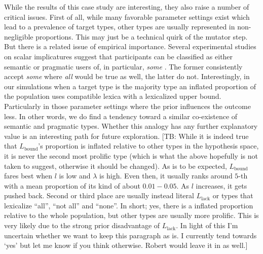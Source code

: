 \documentclass[a4paper, 11pt]{article}
\theoremstyle{Satz}
\newcommand{\tb}[1]{\textcolor[rgb]{.8,.33,.0}{[TB: #1]}}%
\newcommand{\mylang}[1]{\ensuremath{L_{\text{#1}}}\xspace} %
\newcommand{\Lbound}{\mylang{bound}}
\newcommand{\Llack}{\mylang{lack}}
\begin{document}
While the results of this case study are interesting, they also raise a number of critical
issues. First of all, while many favorable parameter settings exist which lead to a prevalence
of target types, other types are usually represented in non-negligible proportions. This may
just be a technical quirk of the mutator step. But there is a related issue of empirical
importance. Several experimental studies on scalar implicatures suggest that participants can
be classified as either semantic or pragmatic users of, in particular, \emph{some}
\citep[e.g.][]{BottNoveck2004:Some-Utterances,NieuwlandDitman2010:On-the-incremen,DegenTanenhaus2012:Processing-Scal}. The
former consistently accept \emph{some} where \emph{all} would be true as well, the latter do
not. Interestingly, in our simulations when a target type is the majority type an inflated
proportion of the population uses compatible lexica with a lexicalized upper bound. Particularly in those parameter
settings where the prior influences the outcome less. In other words, we do find a tendency toward a similar co-existence
of semantic and pragmatic types. Whether this analogy has any further explanatory value is an interesting path for future
exploration. \tb{While it is indeed true that $\Lbound$'s proportion is inflated relative to other types in the hypothesis space, it is never the second most prolific type (which is what the above hopefully is not taken to suggest, otherwise it should be changed). As is to be expected, $\Lbound$ fares best when $l$ is low and $\lambda$ is high. Even then, it usually ranks around $5$-th with a mean proportion of its kind of about $0.01 - 0.05$. As $l$ increases, it gets pushed back. Second or third place are usually instead literal $\Llack$ or types that lexicalize ``all'', ``not all'' and ``none''. In short; yes, there is a inflated proportion relative to the whole population, but other types are usually more prolific. This is very likely due to the strong prior disadvantage of $\Llack$. In light of this I'm uncertain whether we want to keep this paragraph as is. I currently tend towards `yes' but let me know if you think otherwise. Robert would leave it in as well.}
\end{document}
